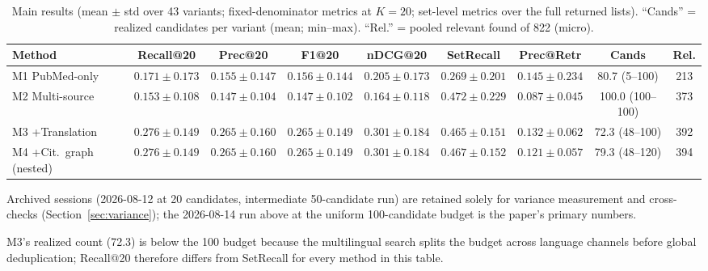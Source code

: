 \documentclass[nonacm,sigconf]{acmart}
\begin{document}
\begin{table}[t]
\centering
\small
\begin{threeparttable}
\caption{Main results (mean $\pm$ std over 43 variants; fixed-denominator
metrics at $K{=}20$; set-level metrics over the full returned lists).
``Cands'' = realized candidates per variant (mean; min--max). ``Rel.''
= pooled relevant found of 822 (micro).}
\label{tab:main}
\footnotesize
\setlength{\tabcolsep}{4.5pt}
\begin{tabular}{@{}lcccccccc@{}}
\toprule
Method & Recall@20 & Prec@20 & F1@20 & nDCG@20 & SetRecall & Prec@Retr & Cands & Rel. \\
\midrule
M1 PubMed-only & $0.171\pm0.173$ & $0.155\pm0.147$ & $0.156\pm0.144$ & $0.205\pm0.173$ & $0.269\pm0.201$ & $0.145\pm0.234$ & 80.7 (5--100) & 213 \\
M2 Multi-source & $0.153\pm0.108$ & $0.147\pm0.104$ & $0.147\pm0.102$ & $0.164\pm0.118$ & $0.472\pm0.229$ & $0.087\pm0.045$ & 100.0 (100--100) & 373 \\
M3 +Translation & $0.276\pm0.149$ & $0.265\pm0.160$ & $0.265\pm0.149$ & $0.301\pm0.184$ & $0.465\pm0.151$ & $0.132\pm0.062$ & 72.3 (48--100) & 392 \\
M4 +Cit.\ graph (nested) & $0.276\pm0.149$ & $0.265\pm0.160$ & $0.265\pm0.149$ & $0.301\pm0.184$ & $0.467\pm0.152$ & $0.121\pm0.057$ & 79.3 (48--120) & 394 \\
\bottomrule
\end{tabular}
\begin{tablenotes}
\item Archived sessions (2026-08-12 at 20 candidates, intermediate
50-candidate run) are retained solely for variance measurement and
cross-checks (Section~\ref{sec:variance}); the 2026-08-14 run above at the
uniform 100-candidate budget is the paper's primary numbers.
\item M3's realized count (72.3) is below the 100 budget because the
multilingual search splits the budget across language channels before
global deduplication; Recall@20 therefore differs from SetRecall for
every method in this table.
\end{tablenotes}
\end{threeparttable}
\end{table}
\end{document}
